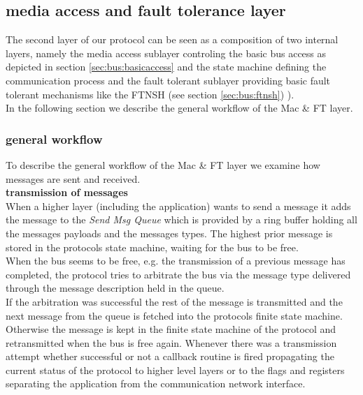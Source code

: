 \subsection{media access and fault tolerance layer}
\label{sec:bus:design:layer2}

The second layer of our protocol can be seen as a composition of two internal layers, 
namely the media access sublayer controling the basic bus access as depicted in section 
\ref{sec:bus:basicaccess}  and the state machine defining 
the communication process and the fault tolerant sublayer providing basic fault 
tolerant mechanisms like the FTNSH (see section \ref{sec:bus:ftnsh}) ).\\

In the following section we describe the general workflow of the Mac \& FT layer.\\

\subsubsection{general workflow}

To describe the general workflow of the Mac \& FT layer we examine how messages are sent and received.\\

\textbf{transmission of messages}\\
When a higher layer (including the application) wants to send a message it adds the message to the \textit{Send Msg Queue} which is provided
by a ring buffer holding all the messages payloads and the messages types. The highest prior message is stored in the protocols state machine, waiting for the bus to be free.\\

When the bus seems to be free, e.g. the transmission of a previous message has completed, the protocol tries to arbitrate the bus via the message type delivered through the message description held in the queue.\\

If the arbitration was successful the rest of the message is transmitted and the next message from the queue is fetched into the protocols finite state machine. Otherwise the message is kept in the finite state machine of the protocol and retransmitted when the bus is free again.
Whenever there was a transmission attempt whether successful or not a callback routine is fired propagating the current status of the protocol to higher level layers or to the flags and registers separating the application from the communication network interface.\\

